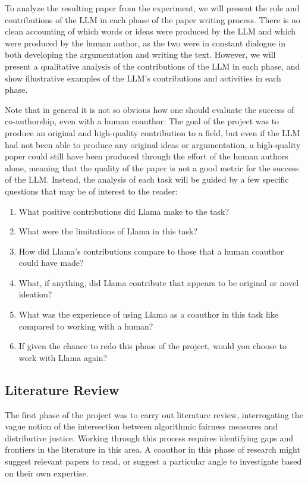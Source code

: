 To analyze the resulting paper from the experiment, we will present the role and
contributions of the LLM in each phase of the paper writing process. There is no
clean accounting of which words or ideas were produced by the LLM and which were
produced by the human author, as the two were in constant dialogue in both
developing the argumentation and writing the text. However, we will present a 
qualitative analysis of the contributions of the LLM in each phase, and show
illustrative examples of the LLM's contributions and activities in each phase.

Note that in general it is not so obvious how one should evaluate the success of
co-authorship, even with a human coauthor. The goal of the project was to
produce an original and high-quality contribution to a field, but even if the 
LLM had not been able to produce any original ideas or argumentation, a
high-quality paper could still have been produced through the effort of the 
human authors alone, meaning that the quality of the paper is not a good metric
for the success of the LLM. Instead, the analysis of each task will be guided by
a few  specific questions that may be of interest to the reader:
\begin{enumerate}
    \item What positive contributions did Llama make to the task?
    \item What were the limitations of Llama in this task?
    \item How did Llama's contributions compare to those that a human coauthor
          could have made?
    \item What, if anything, did Llama contribute that appears to be original
          or novel ideation?
    \item What was the experience of using Llama as a coauthor in this task
          like compared to working with a human?
    \item If given the chance to redo this phase of the project, would you
          choose to work with Llama again?
\end{enumerate}

\subsection{Literature Review}

The first phase of the project was to carry out literature review, interrogating
the vague notion of the intersection between algorithmic fairness measures and
distributive justice. Working through this process requires identifying gaps and
frontiers in the literature in this area. A coauthor in this phase of research
might suggest relevant papers to read, or suggest a particular angle to
investigate based on their own expertise.


